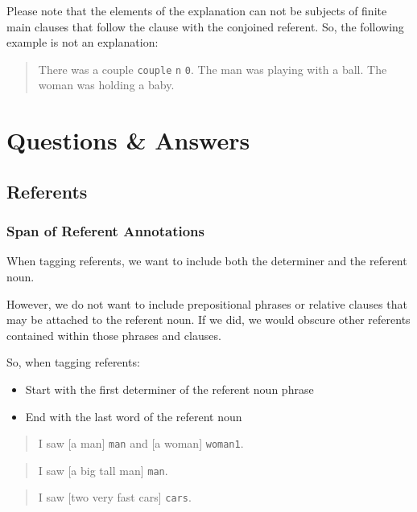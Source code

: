 \documentclass[
]{book}
\providecommand{\tightlist}{%
  \setlength{\itemsep}{0pt}\setlength{\parskip}{0pt}}
\begin{document}
Please note that the elements of the explanation can not be subjects of finite main clauses that follow the clause with the conjoined referent. So, the following example is not an explanation:

\begin{quote}
There was a couple \texttt{couple} \texttt{n} \texttt{0}. The man was playing with a ball. The woman was holding a baby.
\end{quote}

\hypertarget{questions-answers}{%
\chapter{Questions \& Answers}\label{questions-answers}}

\hypertarget{referents-1}{%
\section{Referents}\label{referents-1}}

\hypertarget{span-of-referent-annotations}{%
\subsection{Span of Referent Annotations}\label{span-of-referent-annotations}}

When tagging referents,
we want to include both the determiner and the referent noun.

However,
we do not want to include prepositional phrases or relative clauses
that may be attached to the referent noun.
If we did, we would obscure other referents
contained within those phrases and clauses.

So, when tagging referents:

\begin{itemize}
\tightlist
\item
  Start with the first determiner of the referent noun phrase
\item
  End with the last word of the referent noun
\end{itemize}

\begin{quote}
I saw {[}a man{]} \texttt{man} and {[}a woman{]} \texttt{woman1}.
\end{quote}

\begin{quote}
I saw {[}a big tall man{]} \texttt{man}.
\end{quote}

\begin{quote}
I saw {[}two very fast cars{]} \texttt{cars}.
\end{quote}
\end{document}
